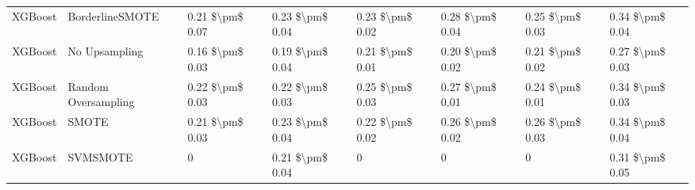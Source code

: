 \begin{tabular}{llllllll}
                        XGBoost &               BorderlineSMOTE & 0.21 \$\textbackslash pm\$ 0.07 &           0.23 \$\textbackslash pm\$ 0.04 &       0.23 \$\textbackslash pm\$ 0.02 &        0.28 \$\textbackslash pm\$ 0.04 &                         0.25 \$\textbackslash pm\$ 0.03 &     0.34 \$\textbackslash pm\$ 0.04 \\
                        XGBoost &                 No Upsampling & 0.16 \$\textbackslash pm\$ 0.03 &           0.19 \$\textbackslash pm\$ 0.04 &       0.21 \$\textbackslash pm\$ 0.01 &        0.20 \$\textbackslash pm\$ 0.02 &                         0.21 \$\textbackslash pm\$ 0.02 &     0.27 \$\textbackslash pm\$ 0.03 \\
                        XGBoost &           Random Oversampling & 0.22 \$\textbackslash pm\$ 0.03 &           0.22 \$\textbackslash pm\$ 0.03 &       0.25 \$\textbackslash pm\$ 0.03 &        0.27 \$\textbackslash pm\$ 0.01 &                         0.24 \$\textbackslash pm\$ 0.01 &     0.34 \$\textbackslash pm\$ 0.03 \\
                        XGBoost &                         SMOTE & 0.21 \$\textbackslash pm\$ 0.03 &           0.23 \$\textbackslash pm\$ 0.04 &       0.22 \$\textbackslash pm\$ 0.02 &        0.26 \$\textbackslash pm\$ 0.02 &                         0.26 \$\textbackslash pm\$ 0.03 &     0.34 \$\textbackslash pm\$ 0.04 \\
                        XGBoost &                      SVMSMOTE &               0 &           0.21 \$\textbackslash pm\$ 0.04 &                     0 &                      0 &                                       0 &     0.31 \$\textbackslash pm\$ 0.05 \\
\bottomrule
\end{tabular}
